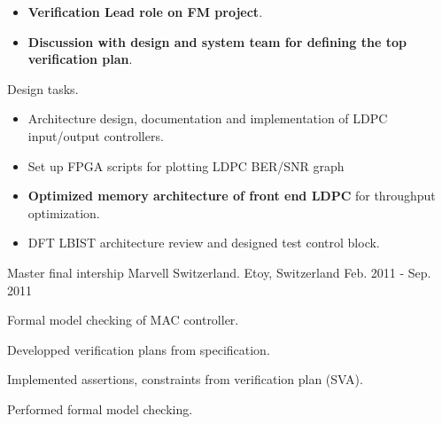 \begin{cventries}
{\begin{cvitems}
\begin{itemize}
          \item {\textbf{Verification Lead role on FM project}.}
          \item {\textbf{Discussion with design and system team for defining the top verification plan}.}
        \end{itemize}
        \item {Design tasks.}
        \begin{itemize}
          \item {Architecture design, documentation and implementation of LDPC input/output controllers.}
          \item {Set up FPGA scripts for plotting LDPC BER/SNR graph}
          \item {\textbf{Optimized memory architecture of front end LDPC} for throughput optimization.}
          \item {DFT LBIST architecture review and designed test control block.}
        \end{itemize}
      \end{cvitems}
    }


  \cventry
    {Master final intership} %
    {Marvell Switzerland.} %
    {Etoy, Switzerland} %
    {Feb. 2011 - Sep. 2011} %
    {
      \begin{cvitems} %
        \item {Formal model checking of MAC controller.}
        \item {Developped verification plans from specification.}
        \item {Implemented assertions, constraints from verification plan (SVA).}
        \item {Performed formal model checking.}
      \end{cvitems}
      \begin{cvsubentries}
      \end{cvsubentries}
    }

\end{cventries}
